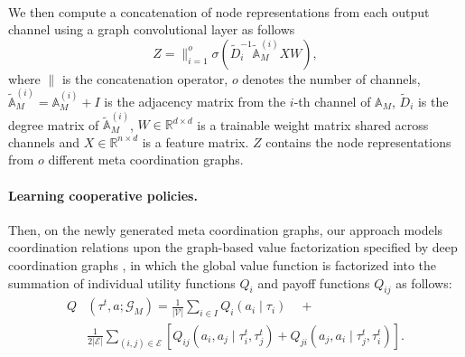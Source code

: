 \paragraph{} We then compute a concatenation of node representations from each output channel using a graph convolutional layer \cite{kipf2017semisupervised} as follows \[ Z = \bigg\|_{i=1}^{o} \sigma(\tilde{D}_i^{-1} \tilde{\mathbb{A}}_M^{(i)} XW), \] where \(\| \) is the concatenation operator, \(o\) denotes the number of channels, \( \tilde{\mathbb{A}}_M^{(i)} = \mathbb{A}_M^{(i)} + I\) is the adjacency matrix from the \(i\)-th channel of \( \mathbb{A}_M \), \(\tilde{D}_i\) is the degree matrix of \(\tilde{\mathbb{A}}_M^{(i)}\), \(W \in \mathbb{R}^{d \times d}\) is a trainable weight matrix shared across channels and \(X \in \mathbb{R}^{n \times d}\) is a feature matrix. \(Z\) contains the node representations from \(o\) different meta coordination graphs. 

\paragraph{Learning cooperative policies.} Then, on the newly generated meta coordination graphs, our approach models coordination relations upon the graph-based value factorization specified by deep coordination graphs \cite{bohmer2020deep}, in which the global value function is factorized into the summation of individual utility functions \( Q_i \) and payoff functions \( Q_{ij} \)  as follows: 
\begin{equation*}
    \begin{split}
        Q&(\tau^t, a; \mathcal{G}_M)= \frac{1}{|\mathcal{V}|} \sum_{i \in I} Q_i(a_i \mid \tau_i) \quad + \\
        & \frac{1}{2|\mathcal{E}|} \sum_{(i,j) \in \mathcal{E}}\left[Q_{ij}(a_i, a_j \mid \tau^t_i, \tau^t_j) + Q_{ji}(a_j, a_i \mid \tau^t_j, \tau^t_i) \right].
    \end{split}
\end{equation*} 


